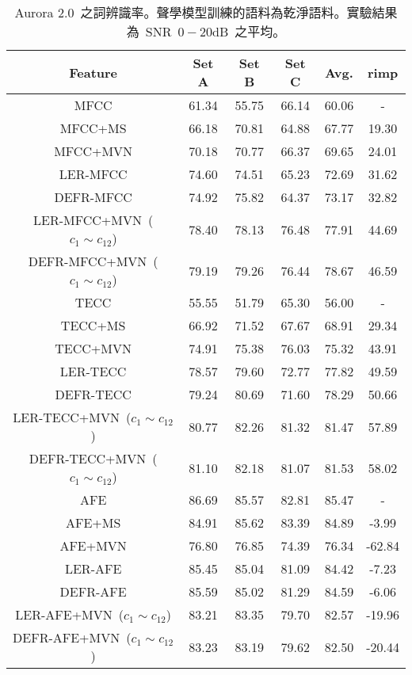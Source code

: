 \begin{table}[!htb]
\renewcommand{\arraystretch}{1.1}
\centering
\caption{Aurora 2.0~之詞辨識率。聲學模型訓練的語料為乾淨語料。實驗結果為~SNR~$0-20$dB~之平均。}
\label{table:aurora2_clean}  
\vspace{2mm}
\begin{tabular}{c|ccc|c|c}
\hline 
Feature & Set A & Set B & Set C & Avg. & rimp  \\ 
\hline \hline
{MFCC} & 61.34 & 55.75 & 66.14 & 60.06 & -\\
{MFCC+MS} & 66.18 & 70.81 & 64.88 & 67.77 & 19.30\\
{MFCC+MVN} & 70.18 & 70.77 & 66.37 & 69.65 & 24.01\\
{LER-MFCC} & 74.60 & 74.51 & 65.23 & 72.69 & 31.62\\
{DEFR-MFCC} & 74.92 & 75.82 & 64.37 & 73.17 & 32.82\\
{LER-MFCC+MVN~($c_1 \sim c_{12}$)} & 78.40 & 78.13 & 76.48 & 77.91 & 44.69\\
{DEFR-MFCC+MVN~($c_1 \sim c_{12}$)} & 79.19 & 79.26 & 76.44 & 78.67 & 46.59\\
\hline
{TECC} & 55.55 & 51.79 & 65.30 & 56.00 &-\\
{TECC+MS} & 66.92 & 71.52 & 67.67 & 68.91 & 29.34\\
{TECC+MVN} & 74.91 & 75.38 & 76.03 & 75.32 & 43.91\\
{LER-TECC} & 78.57 & 79.60 & 72.77 & 77.82 & 49.59\\
{DEFR-TECC}  & 79.24 & 80.69 & 71.60 & 78.29 & 50.66\\
{LER-TECC+MVN~($c_1 \sim c_{12}$)} & 80.77 &  82.26 & 81.32 & 81.47 & 57.89\\
{DEFR-TECC+MVN~($c_1 \sim c_{12}$)} & 81.10 & 82.18 & 81.07 & 81.53 & 58.02\\
\hline
{AFE} & 86.69 & 85.57 & 82.81 & 85.47 &-\\
{AFE+MS} & 84.91 & 85.62 & 83.39 & 84.89 & -3.99 \\
{AFE+MVN} & 76.80 & 76.85 & 74.39 & 76.34 & -62.84 \\
{LER-AFE} & 85.45 & 85.04 & 81.09 & 84.42  & -7.23 \\
{DEFR-AFE} & 85.59 & 85.02 & 81.29  & 84.59  & -6.06 \\
{LER-AFE+MVN~($c_1 \sim c_{12}$)} & 83.21 & 83.35 & 79.70 & 82.57 & -19.96\\
{DEFR-AFE+MVN~($c_1 \sim c_{12}$)} & 83.23 & 83.19 & 79.62 & 82.50 & -20.44\\
\hline
\end{tabular}
\end{table}

